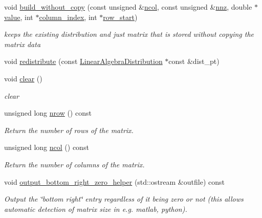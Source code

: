 \begin{DoxyCompactItemize}
void \hyperlink{classoomph_1_1CRDoubleMatrix_aafb4d7de0a87b4bda560928e6a128060}{build\+\_\+without\+\_\+copy} (const unsigned \&\hyperlink{classoomph_1_1CRDoubleMatrix_a4ed5597d8a34dd14f90b0e6cfb88ca2e}{ncol}, const unsigned \&\hyperlink{classoomph_1_1CRDoubleMatrix_a9482dafc0a17ebc5b7431369d8d07565}{nnz}, double $\ast$\hyperlink{classoomph_1_1CRDoubleMatrix_ab8220b7c2bb763dab32a4d0fea7da6f4}{value}, int $\ast$\hyperlink{classoomph_1_1CRDoubleMatrix_a21b3dbb8ee74e1247f80ce4506c395f8}{column\+\_\+index}, int $\ast$\hyperlink{classoomph_1_1CRDoubleMatrix_a25f1efd00318183abd8c65efede3f3f4}{row\+\_\+start})
\begin{DoxyCompactList}\small\item\em keeps the existing distribution and just matrix that is stored without copying the matrix data \end{DoxyCompactList}\item 
void \hyperlink{classoomph_1_1CRDoubleMatrix_a9ba295a04e08e3153ae06bc0556f507d}{redistribute} (const \hyperlink{classoomph_1_1LinearAlgebraDistribution}{Linear\+Algebra\+Distribution} $\ast$const \&dist\+\_\+pt)
\item 
void \hyperlink{classoomph_1_1CRDoubleMatrix_a70c8a67158c081e70b4d07a6b248bc7a}{clear} ()
\begin{DoxyCompactList}\small\item\em clear \end{DoxyCompactList}\item 
unsigned long \hyperlink{classoomph_1_1CRDoubleMatrix_abd8d231b0549540144b4739a667b1e75}{nrow} () const
\begin{DoxyCompactList}\small\item\em Return the number of rows of the matrix. \end{DoxyCompactList}\item 
unsigned long \hyperlink{classoomph_1_1CRDoubleMatrix_a4ed5597d8a34dd14f90b0e6cfb88ca2e}{ncol} () const
\begin{DoxyCompactList}\small\item\em Return the number of columns of the matrix. \end{DoxyCompactList}\item 
void \hyperlink{classoomph_1_1CRDoubleMatrix_ab0887b5420752c47bfc14777006bcc1e}{output\+\_\+bottom\+\_\+right\+\_\+zero\+\_\+helper} (std\+::ostream \&outfile) const
\begin{DoxyCompactList}\small\item\em Output the \char`\"{}bottom right\char`\"{} entry regardless of it being zero or not (this allows automatic detection of matrix size in e.\+g. matlab, python). \end{DoxyCompactList}\item 

\end{DoxyCompactItemize}
